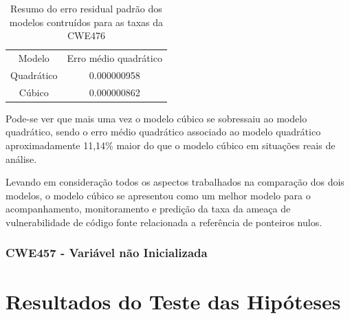 \begin{table}[h]
 \centering
 \begin{tabular}{cc}
  \rowcolor[HTML]{EFEFEF} 
  {Modelo} & {Erro médio quadrático} \\
  Quadrático   & 0.000000958                  \\
  Cúbico       & 0.000000862                 
 \end{tabular}
 \caption{Resumo do erro residual padrão dos modelos contruídos para as taxas da
 CWE476}
 \label{tab:cwe476-erros}
\end{table}

Pode-se ver que mais uma vez o modelo cúbico se sobressaiu ao modelo quadrático,
sendo o erro médio quadrático associado ao modelo quadrático aproximadamente
11,14\% maior do que o modelo cúbico em situações reais de análise.

Levando em consideração todos os aspectos trabalhados na comparação dos dois
modelos, o modelo cúbico se apresentou como um melhor modelo para o
acompanhamento, monitoramento e predição da taxa da ameaça de vulnerabilidade de
código fonte relacionada a referência de ponteiros nulos.

\subsubsection{CWE457 - Variável não Inicializada}

\section{Resultados do Teste das Hipóteses}
